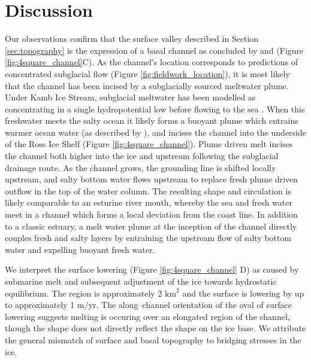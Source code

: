 \section{Discussion} \label{sec:discussion}


\label{sec:meltwater}

Our observations confirm that the surface valley described in Section \ref{sec:topography} is the expression of a basal channel as concluded by \cite{kim2016active} and \cite{alley2016impacts} (Figure \ref{fig:4square_channel}C). 
As the channel's location corresponds to predictions of concentrated subglacial flow (Figure \ref{fig:fieldwork_location}), it is most likely that the channel has been incised by a subglacially sourced meltwater plume. Under Kamb Ice Stream, subglacial meltwater has been modelled as concentrating in a single hydropotential low before flowing to the sea \citep{carter2012supply, le2013evidence}. When this freshwater meets the salty ocean it likely forms a buoyant plume which entrains warmer ocean water (as described by \cite{sergienko2013basal}), and incises the channel into the underside of the Ross Ice Shelf (Figure \ref{fig:4square_channel}). Plume driven melt incises the channel both higher into the ice and upstream following the subglacial drainage route. As the channel grows, the grounding line is shifted locally upstream, and salty bottom water flows upstream to replace fresh plume driven outflow in the top of the water column. The resulting shape and circulation is likely comparable to an esturine river mouth, whereby the sea and fresh water meet in a channel which forms a local deviation from the coast line. In addition to a classic estuary, a melt water plume at the inception of the channel directly couples fresh and salty layers by entraining the upstream flow of salty bottom water and expelling buoyant fresh water. 



\label{sec:surface_lowering}
We interpret the surface lowering (Figure \ref{fig:4square_channel} D) as caused by submarine melt and subsequent adjustment of the ice towards hydrostatic equilibrium. The region is approximately 2 $\mathrm{km}^2$ and the surface is lowering by up to approximately 1 m/yr. The along--channel orientation of the oval of surface lowering suggests melting is occuring over an elongated region of the channel, though the shape does not directly reflect the shape on the ice base. We attribute the general mismatch of surface and basal topography to bridging stresses in the ice.


